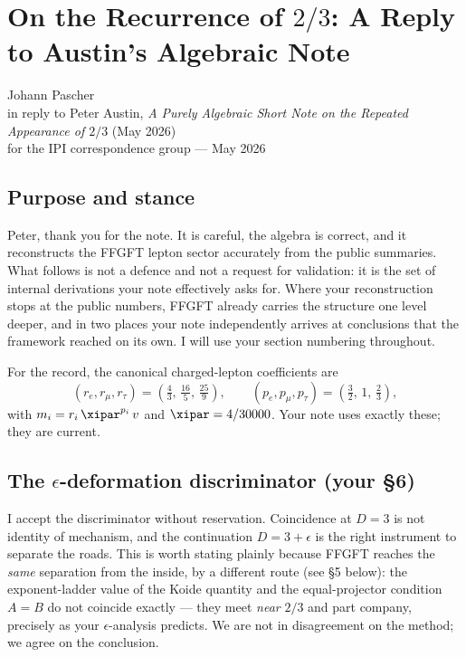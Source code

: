 \chapter*{On the Recurrence of \texorpdfstring{$2/3$}{2/3}: A Reply to Austin's Algebraic Note}

\begin{flushright}\small
Johann Pascher \\
in reply to Peter Austin, \emph{A Purely Algebraic Short Note on the
Repeated Appearance of $2/3$} (May 2026) \\
for the IPI correspondence group --- May 2026
\end{flushright}

\section{Purpose and stance}

Peter, thank you for the note. It is careful, the algebra is correct, and
it reconstructs the FFGFT lepton sector accurately from the public
summaries. What follows is not a defence and not a request for validation:
it is the set of internal derivations your note effectively asks for. Where
your reconstruction stops at the public numbers, FFGFT already carries the
structure one level deeper, and in two places your note independently
arrives at conclusions that the framework reached on its own. I will use
your section numbering throughout.

For the record, the canonical charged-lepton coefficients are
\[
  (r_e, r_\mu, r_\tau) = \left(\tfrac{4}{3},\, \tfrac{16}{5},\, \tfrac{25}{9}\right),
  \qquad
  (p_e, p_\mu, p_\tau) = \left(\tfrac{3}{2},\, 1,\, \tfrac{2}{3}\right),
\]
with $m_i = r_i\,\xipar^{p_i}\,v$ and $\xipar = 4/30000$. Your note uses
exactly these; they are current.

\section{The $\epsilon$-deformation discriminator (your \S6)}

I accept the discriminator without reservation. Coincidence at $D=3$ is not
identity of mechanism, and the continuation $D = 3+\epsilon$ is the right
instrument to separate the roads. This is worth stating plainly because
FFGFT reaches the \emph{same} separation from the inside, by a different
route (see \S5 below): the exponent-ladder value of the Koide quantity and
the equal-projector condition $A=B$ do not coincide exactly --- they meet
\emph{near} $2/3$ and part company, precisely as your $\epsilon$-analysis
predicts. We are not in disagreement on the method; we agree on the
conclusion.

